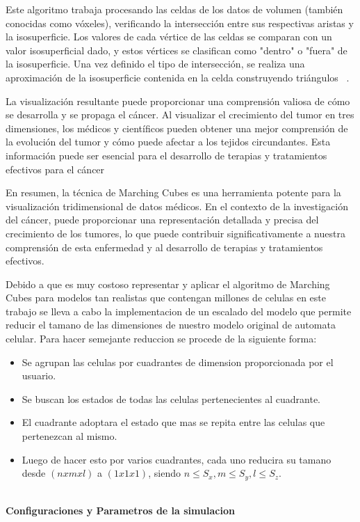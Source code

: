 \documentclass[a4paper,11pt]{article}
\begin{document}
{Este algoritmo trabaja procesando las celdas de los datos de volumen (también conocidas como vóxeles), verificando la intersección entre sus respectivas aristas y la isosuperficie. Los valores de cada vértice de las celdas se comparan con un valor isosuperficial dado, y estos vértices se clasifican como "dentro" o "fuera" de la isosuperficie. Una vez definido el tipo de intersección, se realiza una aproximación de la isosuperficie contenida en la celda construyendo triángulos ~\cite{6}.

La visualización resultante puede proporcionar una comprensión valiosa de cómo se desarrolla y se propaga el cáncer. Al visualizar el crecimiento del tumor en tres dimensiones, los médicos y científicos pueden obtener una mejor comprensión de la evolución del tumor y cómo puede afectar a los tejidos circundantes. Esta información puede ser esencial para el desarrollo de terapias y tratamientos efectivos para el cáncer 

En resumen, la técnica de Marching Cubes es una herramienta potente para la visualización tridimensional de datos médicos. En el contexto de la investigación del cáncer, puede proporcionar una representación detallada y precisa del crecimiento de los tumores, lo que puede contribuir significativamente a nuestra comprensión de esta enfermedad y al desarrollo de terapias y tratamientos efectivos.

Debido a que es muy costoso representar y aplicar el algoritmo de Marching Cubes para modelos tan realistas que contengan millones de celulas en este trabajo se lleva a cabo la implementacion de un escalado del modelo que permite reducir el tamano de las dimensiones de nuestro modelo original de automata celular. Para hacer semejante reduccion se procede de la siguiente forma:
\begin{itemize}
    \item Se agrupan las celulas por cuadrantes de dimension proporcionada por el usuario.
    \item Se buscan los estados de todas las celulas pertenecientes al cuadrante.
    \item El cuadrante adoptara el estado que mas se repita entre las celulas que pertenezcan al mismo.
    \item Luego de hacer esto por varios cuadrantes, cada uno reducira su tamano desde $(n x m x l)$ a $(1 x 1 x 1)$, siendo $n \leq S_{x} ,m \leq S_{y},l \leq S_{z}$. 
\end{itemize}
\\
\textbf{Configuraciones y Parametros de la simulacion}

}
\end{document}

